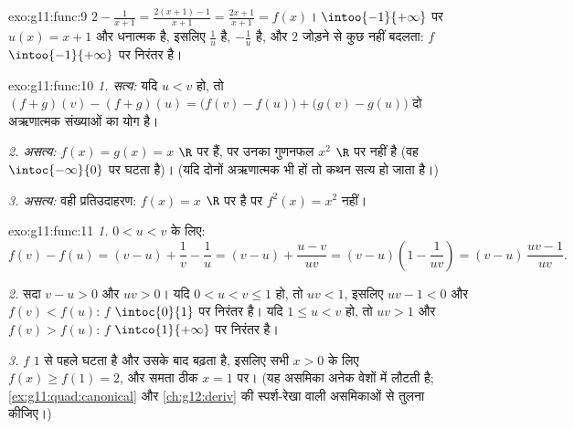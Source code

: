 \begin{solution}{exo:g11:func:9}
$2 - \frac{1}{x+1} = \frac{2(x+1) - 1}{x+1} = \frac{2x+1}{x+1} = f(x)$। $\intoo{-1}{+\infty}$ पर $u(x) = x + 1$  और धनात्मक है, इसलिए $\frac1u$  है, $-\frac1u$
 है, और $2$ जोड़ने से कुछ नहीं बदलता: $f$ $\intoo{-1}{+\infty}$ पर निरंतर 
है।
\end{solution}

\begin{solution}{exo:g11:func:10}
\emph{1. सत्य:} यदि $u < v$ हो, तो $(f+g)(v) - (f+g)(u) = \bigl(f(v)-f(u)\bigr) + \bigl(g(v)-g(u)\bigr)$ दो अऋणात्मक संख्याओं का योग है।

\emph{2. असत्य:} $f(x) = g(x) = x$ $\R$ पर  हैं, पर उनका गुणनफल $x^2$ $\R$ पर
 नहीं है (वह $\intoc{-\infty}{0}$ पर घटता है)। (यदि दोनों  अऋणात्मक भी हों तो
कथन सत्य हो जाता है।)

\emph{3. असत्य:} वही प्रतिउदाहरण: $f(x) = x$ $\R$ पर  है पर $f^2(x) = x^2$ नहीं।
\end{solution}

\begin{solution}{exo:g11:func:11}
\emph{1.} $0 < u < v$ के लिए:
\[
f(v) - f(u) = (v - u) + \frac1v - \frac1u
= (v - u) + \frac{u - v}{uv}
= (v - u)\left(1 - \frac{1}{uv}\right)
= (v - u)\,\frac{uv - 1}{uv}.
\]

\emph{2.} सदा $v - u > 0$ और $uv > 0$। यदि $0 < u < v \leq 1$ हो, तो $uv < 1$, इसलिए $uv - 1 < 0$ और $f(v) < f(u)$:
$f$ $\intoc{0}{1}$ पर निरंतर  है। यदि $1 \leq u < v$ हो, तो $uv > 1$ और $f(v) > f(u)$: $f$
$\intco{1}{+\infty}$ पर निरंतर  है।

\emph{3.} $f$ $1$ से पहले घटता है और उसके बाद बढ़ता है, इसलिए सभी $x > 0$
के लिए $f(x) \geq f(1) = 2$, और समता ठीक $x = 1$ पर। (यह असमिका अनेक वेशों में लौटती है;
\cref{ex:g11:quad:canonical} और \cref{ch:g12:deriv} की स्पर्श-रेखा वाली असमिकाओं से तुलना कीजिए।)
\end{solution}

